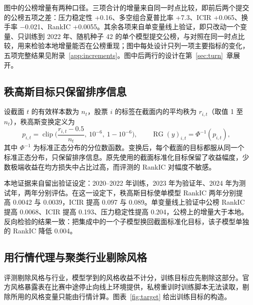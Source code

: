 \documentclass[UTF8,a4paper,zihao=-4,fontset=none]{ctexart}
\newcommand{\figref}[1]{图表~\ref{#1}}
\begin{document}
图中的公榜增量有两种口径。三项合计的增量来自同一时点比较，即前后两个提交的公榜五项之差：压力稳定性 +0.16、多空组合夏普比率 +7.3、ICIR +0.065、换手率 −0.021、RankIC +0.0055。其余各项来自单变量线上验证，即只改动一个变量、只训练到 2022 年、随机种子 42 的单个模型提交公榜，与对照在同一时点比较，用来检验本地增量能否在公榜重现；图中每处设计只列一项主要指标的变化，五项完整结果见附录~\ref{app:increments}。图中后两行的设计在第~\ref{sec:turn}~章展开。

\subsection{秩高斯目标只保留排序信息}\label{sec:rg}

设截面 $t$ 的有效样本数为 $n_t$，股票 $i$ 的标签在截面内的平均秩为 $r_{i,t}$（取值 1 至 $n_t$），秩高斯变换定义为
\begin{equation}\label{eq:rg}
p_{i,t}=\operatorname{clip}\!\Big(\frac{r_{i,t}-0.5}{n_t},\ 10^{-6},\ 1-10^{-6}\Big),\qquad
\operatorname{RG}(y)_{i,t}=\Phi^{-1}(p_{i,t}),
\end{equation}
其中 $\Phi^{-1}$ 为标准正态分布的分位数函数。变换后，每个截面的目标都服从同一个标准正态分布，只保留排序信息。原先使用的截面标准化目标保留了收益幅度，少数极端收益在均方损失中占比过高，而评测的 RankIC 对幅度不敏感。

本地证据来自留出验证设定：2020–2022 年训练，2023 年为验证年、2024 年为测试年，两年分别评估。在这一设定下，秩高斯目标使单模型 RankIC 两年分别提高 0.0042 与 0.0039，ICIR 提高 0.097 与 0.089。单变量线上验证中公榜 RankIC 提高 0.0068、ICIR 提高 0.193、压力稳定性提高 0.204，公榜上的增量大于本地。反向检验的结果一致：把集成中的一个子模型换回截面标准化目标，该子模型单独的 RankIC 降低 0.004。

\subsection{用行情代理与聚类行业剔除风格}\label{sec:proxy}

评测剔除风格与行业，模型学到的风格收益不计分，训练目标应先剔除这部分。官方风格暴露表在比赛中途停止向线上环境提供，私榜重训时训练脚本无法读取，剔除所用的风格变量只能由行情计算。\figref{fig:target} 给出训练目标的构造。
\end{document}
